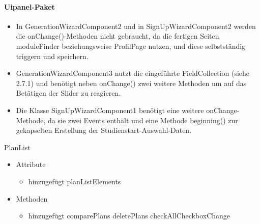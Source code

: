 \paragraph{Uipanel-Paket} 
\begin{itemize}
\item In GenerationWizardComponent2 und in SignUpWizardComponent2 werden die onChange()-Methoden nicht gebraucht, da die fertigen Seiten moduleFinder beziehungsweise ProfilPage nutzen, und diese selbstständig triggern und speichern. 
\item GenerationWizardComponent3 nutzt die eingeführte FieldCollection (siehe 2.7.1) und benötigt neben onChange() zwei weitere Methoden um auf das Betätigen der Slider zu reagieren.
\item Die Klasse SignUpWizardComponent1 benötigt eine weitere onChange-Methode, da sie zwei Events enthält und eine Methode beginning() zur gekapselten Erstellung der Studienstart-Auswahl-Daten.
\end{itemize}

PlanList
	\begin{itemize}
		\item Attribute		
		\begin{itemize}
			\item hinzugefügt
				\subitem planListElements
		\end{itemize}
		\item Methoden
		\begin{itemize}
			\item hinzugefügt
				\subitem comparePlans
				\subitem deletePlans
				\subitem checkAllCheckboxChange
		\end{itemize}
	\end{itemize}
